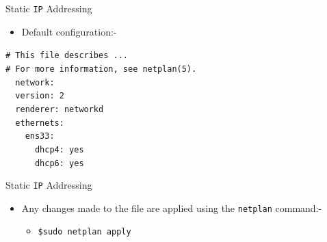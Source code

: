 \documentclass{beamer}
\begin{document}
\begin{frame}{Static \texttt{IP} Addressing}
  \begin{itemize}
    \item Default configuration:-
  \end{itemize}
    \begin{center}
      \begin{minipage}{8cm}
        \begin{block}{}
          \texttt{\# This file describes ...\\
          \# For more information, see netplan(5).\\
          ~~network:\\
          ~~version: 2\\
          ~~renderer: networkd\\
          ~~ethernets:\\
          ~~~~ens33:\\
          ~~~~~~dhcp4: yes\\
          ~~~~~~dhcp6: yes}
        \end{block}
      \end{minipage}
    \end{center}
\end{frame}

\begin{frame}{Static \texttt{IP} Addressing}
  \begin{itemize}
    \item Any changes made to the file are applied using the \texttt{netplan} command:-
    \begin{itemize}
      \item \texttt{\$sudo netplan apply}
    \end{itemize}
  \end{itemize}
\end{frame}
\end{document}
